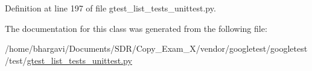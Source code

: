 Definition at line 197 of file gtest\+\_\+list\+\_\+tests\+\_\+unittest.\+py.



The documentation for this class was generated from the following file\+:\begin{DoxyCompactItemize}
\item 
/home/bhargavi/\+Documents/\+S\+D\+R/\+Copy\+\_\+\+Exam\+\_\+X/vendor/googletest/googletest/test/\hyperlink{gtest__list__tests__unittest_8py}{gtest\+\_\+list\+\_\+tests\+\_\+unittest.\+py}\end{DoxyCompactItemize}

